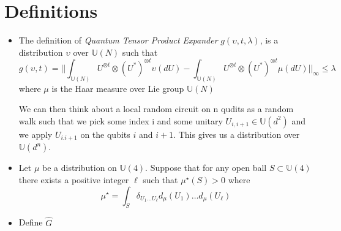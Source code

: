 \documentclass[a4paper]{article}
\begin{document}
\section{Definitions}
\label{sec:org3570d46}
\begin{itemize}
\item The definition of \emph{Quantum Tensor Product Expander} \(g(\upsilon,t,\lambda)\), is a distribution \(\upsilon\) over \(\mathbb{U}(N)\) such that
$$ g(\upsilon, t) = || \int_{\mathbb{U}(N)} U^{\otimes t} \otimes (U^*)^{\otimes t} \upsilon(dU) - \int_{\mathbb{U}(N)} U^{\otimes t} \otimes (U^*)^{\otimes t} \mu(dU)||_{\infty} \leq \lambda $$
where \(\mu\) is the Haar measure over Lie group \(\mathbb{U}(N)\)

We can then think about a local random circuit on n qudits as a random walk such that we pick some index i and some unitary \(U_{i,i+1} \in \mathbb{U}(d^2)\) and we apply \(U_{i.i+1}\) on the qubits \(i\) and \(i+1\). This gives us a distribution over \(\mathbb{U}(d^n)\).
\item Let \(\mu\) be a distribution on \(\mathbb{U}(4)\). Suppose that for any open ball \(S \subset \mathbb{U}(4)\) there exists a positive integer \(\ell\) such that \(\mu^{\star}(S) > 0\) where $$\mu^{\star} = \int_{S} \delta_{U_1 \dots U_{\ell}} d_{\mu}(U_1)\dots d_{\mu}(U_{\ell}) $$

\item Define \(\hat{G}\)
\end{itemize}
\end{document}

